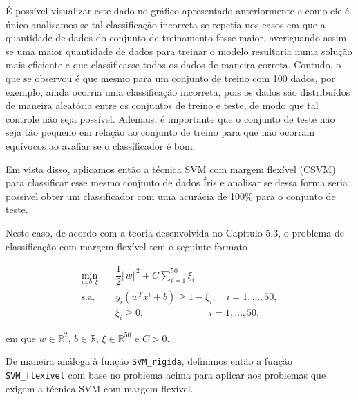 \documentclass[12pt,a4paper]{scrartcl}
\theoremstyle{definition}%
\begin{document}
É possível visualizar este dado no gráfico apresentado anteriormente e
como ele é único analisamos se tal classificação incorreta se repetia
nos casos em que a quantidade de dados do conjunto de treinamento fosse
maior, averiguando assim se uma maior quantidade de dados para treinar o
modelo resultaria numa solução mais eficiente e que classificasse todos
os dados de maneira correta. Contudo, o que se observou é que mesmo para
um conjunto de treino com 100 dados, por exemplo, ainda ocorria uma
classificação incorreta, pois os dados são distribuídos de maneira
aleatória entre os conjuntos de treino e teste, de modo que tal controle
não seja possível. Ademais, é importante que o conjunto de teste não
seja tão pequeno em relação ao conjunto de treino para que não ocorram
equívocos ao avaliar se o classificador é bom.

Em vista disso, aplicamos então a técnica SVM com margem flexível (CSVM)
para classificar esse mesmo conjunto de dados Íris e analisar se dessa
forma seria possível obter um classificador com uma acurácia de 100\%
para o conjunto de teste.

Neste caso, de acordo com a teoria desenvolvida no Capítulo 5.3, o
problema de classificação com margem flexível tem o seguinte formato

\begin{align}
\min_{w,b, \xi} & \quad \dfrac{1}{2} \Vert w\Vert^{2} + C\sum_{i=1}^{50} \xi_{i} \\
\text{s.a.} &  \quad y_i(w^{T}x^{i}+b) \geq 1 - \xi_{i} , \quad i=1, \ldots , 50, \\
& \quad \xi_{i} \geq 0 , \ \ \ \qquad \qquad \qquad i=1, \ldots , 50, 
\end{align}

em que \(w \in \mathbb{R}^{2}\), \(b\in \mathbb{R}\),
\(\xi \in \mathbb{R}^{50}\) e \(C >0\).

De maneira análoga à função \texttt{SVM\_rigida}, definimos então a
função \texttt{SVM\_flexivel} com base no problema acima para aplicar
aos problemas que exigem a técnica SVM com margem flexível.
\end{document}
